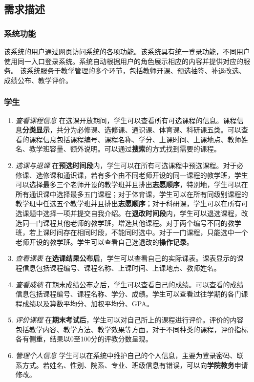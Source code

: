 \subsection{需求描述}

\subsubsection{系统功能}
\ttfamily
该系统的用户通过{\sffamily 网页}访问系统的各项功能。该系统具有{\sffamily 统一登录}功能，不同用户使用同一入口登录系统。系统自动根据用户的角色展示相应的内容并提供对应的服务。
该系统服务于教学管理的多个环节，包括教师开课、预选抽签、补退改选、成绩公布、教学评价。

\normalfont

\subsubsection{学生}
\begin{enumerate}
    \item \textit{查看课程信息} \quad 在选课开放期间，学生可以查看所有可选课程的信息。课程信息\textbf{分类显示}，共分为必修课、选修课、通识课、体育课、科研课五类。可以查看的课程信息包括课程编号、课程名称、学分、上课时间、上课地点、教师姓名、教学班容量、额外说明。可以通过\textbf{搜索}的方式找到需要的课程。
    \item \textit{选课与退课} \quad 在\textbf{预选时间段}内，学生可以在所有可选课程中预选课程。对于必修课、选修课和通识课，若有多个由不同老师开设的同一课程的教学班，学生可以选择最多三个老师开设的教学班并且排出\textbf{志愿顺序}，特别地，学生可以在所有通识课中选择最多五门课程；对于体育课，学生可以在所有同级别课程的教学班中任选五个教学班并且排出\textbf{志愿顺序}；对于科研课，学生可以在所有可选课题中选择一项并提交自我介绍。在\textbf{退改时间段}内，学生可以退选课程，改选同一门课程其他老师的教学班，增选其他课程。对于两个编号不同的教学班，若上课时间存在相同时段，不能同时选中。对于一门课程，只能选中一个老师开设的教学班。学生可以查看自己选退改的\textbf{操作记录}。
    \item \textit{查看课表} \quad 在\textbf{选课结果公布后}，学生可以查看自己的实际课表。课表显示的课程信息包括课程编号、课程名称、上课时间、上课地点、教师姓名。
    \item \textit{查看成绩} \quad 在期末成绩公布之后，学生可以查看自己的成绩。可以查看的成绩信息包括课程编号、课程名称、学分、成绩。学生可以查看过往学期的各门课程成绩以及算数平均分、加权平均分、GPA。
    \item \textit{评价课程} \quad 在\textbf{期末考试后}，学生可以对自己所上的课程进行评价。评价的内容包括教学内容、教学方法、教学效果等方面，对于不同种类的课程，评价指标各有侧重，结果以0至100分的评教分数呈现。
    \item \textit{管理个人信息} \quad 学生可以在系统中维护自己的个人信息，主要为登录密码、联系方式。若姓名、性别、院系、专业、班级信息有错误，可以向\textbf{学院教务}申请修改。
\end{enumerate}

